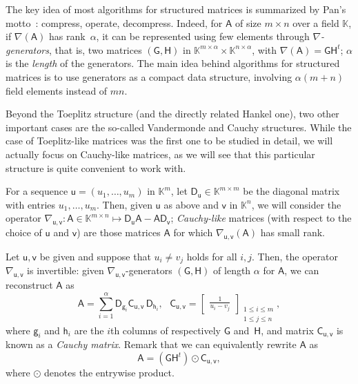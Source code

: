 \documentclass[sigconf]{acmart}
\newcommand{\vg}{\ensuremath{\mathsf{g}}}
\newcommand{\vh}{\ensuremath{\mathsf{h}}}
\newcommand{\vu}{\ensuremath{\mathsf{u}}}
\newcommand{\vv}{\ensuremath{\mathsf{v}}}
\newcommand{\mA}{\ensuremath{\mathsf{A}}}
\newcommand{\mC}{\ensuremath{\mathsf{C}}}
\newcommand{\mD}{\ensuremath{\mathsf{D}}}
\newcommand{\mG}{\ensuremath{\mathsf{G}}}
\newcommand{\mH}{\ensuremath{\mathsf{H}}}
\newcommand{\K}{\ensuremath{\mathbb{K}}}
\theoremstyle{acmdefinition}
\begin{document}
The key idea of most algorithms for structured matrices is summarized
by Pan's motto~\cite{Pan01}: compress, operate, decompress. Indeed,
for $\mA$ of size $m \times n$ over a field $\K$, if $\nabla(\mA)$ has
rank~$\alpha$, it can be represented using few elements through {\it
  $\nabla$-generators}, that is, two matrices $(\mG,\mH)$ in
$\K^{m\times \alpha} \times \K^{n\times \alpha}$, with $\nabla(\mA) =
\mG \mH^t$; $\alpha$ is the {\em length} of the generators. The main
idea behind algorithms for structured matrices is to use generators as
a compact data structure, involving $\alpha (m+n)$ field elements
instead of $mn$.

\smallskip{}  Beyond the
Toeplitz structure (and the directly related Hankel one), two other
important cases are the so-called Vandermonde and Cauchy
structures. While the case of Toeplitz-like matrices was the first one
to be studied in detail, we will actually focus on Cauchy-like
matrices, as we will see that this particular structure is quite
convenient to work with.

For a sequence $\vu=(u_1,\dots,u_m)$ in $\K^m$, let $\mD_\vu \in
\K^{m\times m}$ be the diagonal matrix with entries
$u_1,\dots,u_m$. Then, given $\vu$ as above and $\vv$ in $\K^n$, we will
consider the operator $\nabla_{\vu,\vv}: \mA \in \K^{m\times n} \mapsto \mD_\vu
\mA - \mA \mD_\vv$; {\em Cauchy-like} matrices (with respect to the
choice of $\vu$ and $\vv$) are those matrices $\mA$ for which
$\nabla_{\vu,\vv}(\mA)$ has small rank.

Let $\vu,\vv$ be given and suppose that $u_i \ne v_j$ holds for all
$i,j$. Then, the operator $\nabla_{\vu,\vv}$ is invertible: given
$\nabla_{\vu,\vv}$-generators $(\mG,\mH)$ of length $\alpha$ for $\mA$, we can reconstruct $\mA$ as
\begin{equation}\label{eq:recA}
\mA = \sum_{i=1}^\alpha
\mD_{\vg_i} 
\mC_{\vu,\vv}\,\mD_{\vh_i},\ \ \ 
\mC_{\vu,\vv}=\begin{bmatrix}
\frac 1{u_i-v_j}
\end{bmatrix}_{\substack{1 \leq i \leq m\\1 \leq j \leq n}},
\end{equation}
where $\vg_i$ and $\vh_i$ are the $i$th columns of respectively $\mG$
and~$\mH$, and  matrix $\mC_{\vu,\vv}$ is known as a {\em Cauchy
  matrix}. Remark that we can
equivalently rewrite $\mA$ as
\begin{equation}\label{eq:recA2}
\mA= (\mG \mH^t) \odot \mC_{\vu,\vv},
\end{equation}
where $\odot$ denotes the entrywise product.
\end{document}

